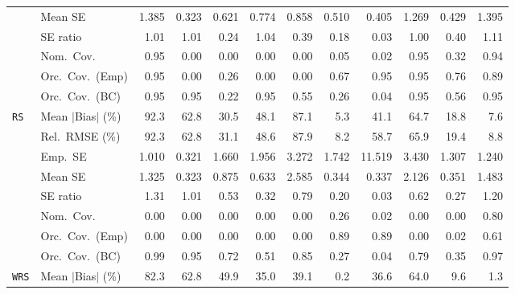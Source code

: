 \begin{landscape}
\begin{longtable}{llrrrrrrrrrr}
 & Mean SE & 1.385 & 0.323 & 0.621 & 0.774 & 0.858 & 0.510 & 0.405 & 1.269 & 0.429 & 1.395 \\
 & SE ratio & \cellcolor{ranktwo}1.01 & \cellcolor{ranktwo}1.01 & 0.24 & \cellcolor{rankthree}1.04 & 0.39 & 0.18 & 0.03 & \cellcolor{rankone}1.00 & 0.40 & 1.11 \\
 & Nom.\ Cov. & \cellcolor{rankone}0.95 & 0.00 & 0.00 & 0.00 & 0.00 & 0.05 & 0.02 & \cellcolor{rankone}0.95 & \cellcolor{rankthree}0.32 & \cellcolor{ranktwo}0.94 \\
 & Orc.\ Cov.\ (Emp) & \cellcolor{rankone}0.95 & 0.00 & 0.26 & 0.00 & 0.00 & 0.67 & \cellcolor{rankone}0.95 & \cellcolor{rankone}0.95 & \cellcolor{rankthree}0.76 & \cellcolor{ranktwo}0.89 \\
 & Orc.\ Cov.\ (BC) & \cellcolor{rankone}0.95 & \cellcolor{rankone}0.95 & 0.22 & \cellcolor{rankone}0.95 & \cellcolor{rankthree}0.55 & 0.26 & 0.04 & \cellcolor{rankone}0.95 & \cellcolor{ranktwo}0.56 & \cellcolor{rankone}0.95 \\
\addlinespace[2pt]
\quad \texttt{RS} & Mean $|$Bias$|$ (\%) & 92.3 & 62.8 & 30.5 & 48.1 & 87.1 & \cellcolor{rankone}5.3 & 41.1 & 64.7 & \cellcolor{rankthree}18.8 & \cellcolor{ranktwo}7.6 \\
 & Rel.\ RMSE (\%) & 92.3 & 62.8 & 31.1 & 48.6 & 87.9 & \cellcolor{rankone}8.2 & 58.7 & 65.9 & \cellcolor{rankthree}19.4 & \cellcolor{ranktwo}8.8 \\
 & Emp.\ SE & 1.010 & 0.321 & 1.660 & 1.956 & 3.272 & 1.742 & 11.519 & 3.430 & 1.307 & 1.240 \\
 & Mean SE & 1.325 & 0.323 & 0.875 & 0.633 & 2.585 & 0.344 & 0.337 & 2.126 & 0.351 & 1.483 \\
 & SE ratio & 1.31 & \cellcolor{rankone}1.01 & 0.53 & 0.32 & \cellcolor{rankthree}0.79 & 0.20 & 0.03 & 0.62 & 0.27 & \cellcolor{ranktwo}1.20 \\
 & Nom.\ Cov. & 0.00 & 0.00 & 0.00 & 0.00 & 0.00 & \cellcolor{ranktwo}0.26 & \cellcolor{rankthree}0.02 & 0.00 & 0.00 & \cellcolor{rankone}0.80 \\
 & Orc.\ Cov.\ (Emp) & 0.00 & 0.00 & 0.00 & 0.00 & 0.00 & \cellcolor{rankone}0.89 & \cellcolor{rankone}0.89 & 0.00 & \cellcolor{rankthree}0.02 & \cellcolor{ranktwo}0.61 \\
 & Orc.\ Cov.\ (BC) & \cellcolor{rankthree}0.99 & \cellcolor{rankone}0.95 & 0.72 & 0.51 & 0.85 & 0.27 & 0.04 & 0.79 & 0.35 & \cellcolor{ranktwo}0.97 \\
\addlinespace[2pt]
\quad \texttt{WRS} & Mean $|$Bias$|$ (\%) & 82.3 & 62.8 & 49.9 & 35.0 & 39.1 & \cellcolor{rankone}0.2 & 36.6 & 64.0 & \cellcolor{rankthree}9.6 & \cellcolor{ranktwo}1.3 \\

\end{longtable}
\end{landscape}
